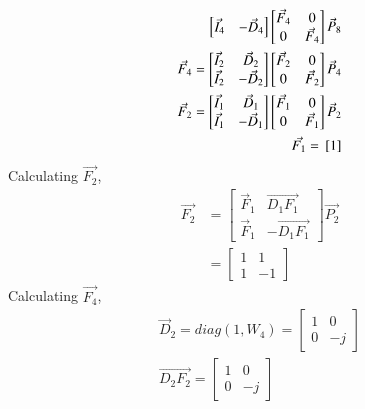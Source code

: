 \documentclass[journal,12pt,twocolumn]{IEEEtran}
\renewcommand\thesection{\arabic{section}}
\begin{document}
\begin{enumerate}[label=\thesection.\arabic*]
\begin{enumerate}[label=\arabic*.,ref=\thesection.\theenumi]
\begin{align}
\begin{bmatrix}
         \vec{I}_{4} & -\vec{D}_{4}
       \end{bmatrix}
       \begin{bmatrix}
         \vec{F}_{4} & 0 \\
         0 & \vec{F}_{4}
       \end{bmatrix}
       \vec{P}_{8}\\
       \vec{F}_{4}=
       \begin{bmatrix}
         \vec{I}_{2} & \vec{D}_{2} \\
         \vec{I}_{2} & -\vec{D}_{2}
       \end{bmatrix}
       \begin{bmatrix}
         \vec{F}_{2} & 0 \\
         0 & \vec{F}_{2}
       \end{bmatrix}
       \vec{P}_{4}\\
       \vec{F}_{2}=
       \begin{bmatrix}
         \vec{I}_{1} & \vec{D}_{1} \\
         \vec{I}_{1} & -\vec{D}_{1}
       \end{bmatrix}
       \begin{bmatrix}
         \vec{F}_{1} & 0 \\
         0 & \vec{F}_{1}
       \end{bmatrix}
       \vec{P}_{2}\\
       \vec{F_1}={}\left[1\right]
     \end{align}
     Calculating $\vec{F_2}$,
     \begin{align}
       \vec{F_2}&=\begin{bmatrix}
         \vec{F}_{1} & \vec{D_1F_1} \\
         \vec{F}_{1} & -\vec{D_1F_1}
       \end{bmatrix}\vec{P_2}\\
       &=\begin{bmatrix}1&1\\1&-1\end{bmatrix}
     \end{align}
     Calculating $\vec{F_4}$,
     \begin{align}
       \vec{D}_{2}=diag(1,W_4)
       =\begin{bmatrix}
         1&0\\0&-j
       \end{bmatrix}\\
       \vec{D_2F_2}=\begin{bmatrix}
         1&0\\0&-j

\end{bmatrix}
\end{align}
\end{enumerate}
\end{enumerate}
\end{document}
